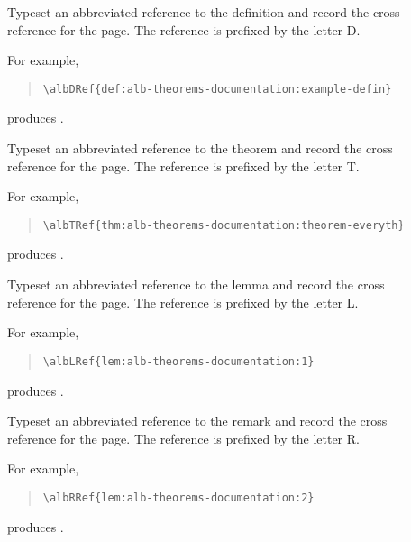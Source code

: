 \documentclass[11pt,a4paper,oneside,titlepage]{alb-latex}
\begin{document}
\begin{description}
\item[] Typeset an abbreviated
  reference to the  definition and record the cross
  reference for the page.  The reference is prefixed by the letter D.

  For example,
  \begin{quote}
\begin{verbatim}
\albDRef{def:alb-theorems-documentation:example-defin}
\end{verbatim}
  \end{quote}
  produces .

\item[] Typeset an abbreviated
  reference to the  theorem and record the cross
  reference for the page.  The reference is prefixed by the letter T.

  For example,
  \begin{quote}
\begin{verbatim}
\albTRef{thm:alb-theorems-documentation:theorem-everyth}
\end{verbatim}
  \end{quote}
  produces .

\item[] Typeset an abbreviated
  reference to the  lemma and record the cross
  reference for the page.  The reference is prefixed by the letter L.

  For example,
  \begin{quote}
\begin{verbatim}
\albLRef{lem:alb-theorems-documentation:1}
\end{verbatim}
  \end{quote}
  produces .

\item[] Typeset an abbreviated
  reference to the  remark and record the cross
  reference for the page.  The reference is prefixed by the letter R.

  For example,
  \begin{quote}
\begin{verbatim}
\albRRef{lem:alb-theorems-documentation:2}
\end{verbatim}
  \end{quote}
  produces .


\end{description}
\end{document}
